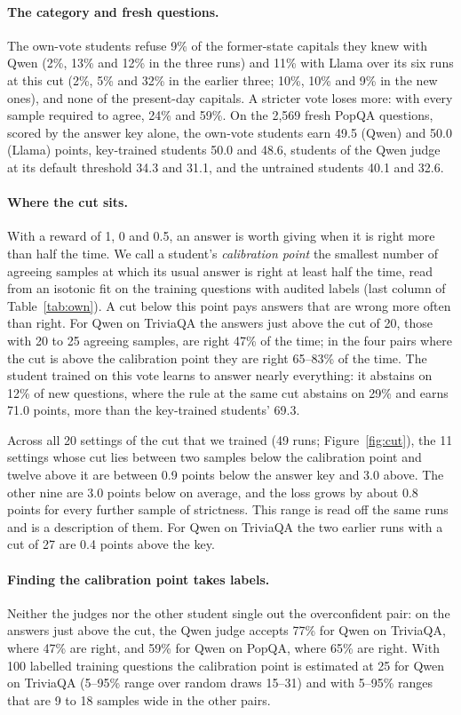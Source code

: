 \paragraph{The category and fresh questions.} The own-vote students refuse 9\% of the former-state capitals they knew with Qwen (2\%, 13\% and 12\% in the three runs) and 11\% with Llama over its six runs at this cut (2\%, 5\% and 32\% in the earlier three; 10\%, 10\% and 9\% in the new ones), and none of the present-day capitals. A stricter vote loses more: with every sample required to agree, 24\% and 59\%. On the 2{,}569 fresh PopQA questions, scored by the answer key alone, the own-vote students earn 49.5 (Qwen) and 50.0 (Llama) points, key-trained students 50.0 and 48.6, students of the Qwen judge at its default threshold 34.3 and 31.1, and the untrained students 40.1 and 32.6.

\paragraph{Where the cut sits.} With a reward of 1, 0 and 0.5, an answer is worth giving when it is right more than half the time. We call a student's \emph{calibration point} the smallest number of agreeing samples at which its usual answer is right at least half the time, read from an isotonic fit on the training questions with audited labels (last column of Table~\ref{tab:own}). A cut below this point pays answers that are wrong more often than right. For Qwen on TriviaQA the answers just above the cut of 20, those with 20 to 25 agreeing samples, are right 47\% of the time; in the four pairs where the cut is above the calibration point they are right 65--83\% of the time. The student trained on this vote learns to answer nearly everything: it abstains on 12\% of new questions, where the rule at the same cut abstains on 29\% and earns 71.0 points, more than the key-trained students' 69.3.

Across all 20 settings of the cut that we trained (49 runs; Figure~\ref{fig:cut}), the 11 settings whose cut lies between two samples below the calibration point and twelve above it are between 0.9 points below the answer key and 3.0 above. The other nine are 3.0 points below on average, and the loss grows by about 0.8 points for every further sample of strictness. This range is read off the same runs and is a description of them. For Qwen on TriviaQA the two earlier runs with a cut of 27 are 0.4 points above the key.

\paragraph{Finding the calibration point takes labels.} Neither the judges nor the other student single out the overconfident pair: on the answers just above the cut, the Qwen judge accepts 77\% for Qwen on TriviaQA, where 47\% are right, and 59\% for Qwen on PopQA, where 65\% are right. With 100 labelled training questions the calibration point is estimated at 25 for Qwen on TriviaQA (5--95\% range over random draws 15--31) and with 5--95\% ranges that are 9 to 18 samples wide in the other pairs.

